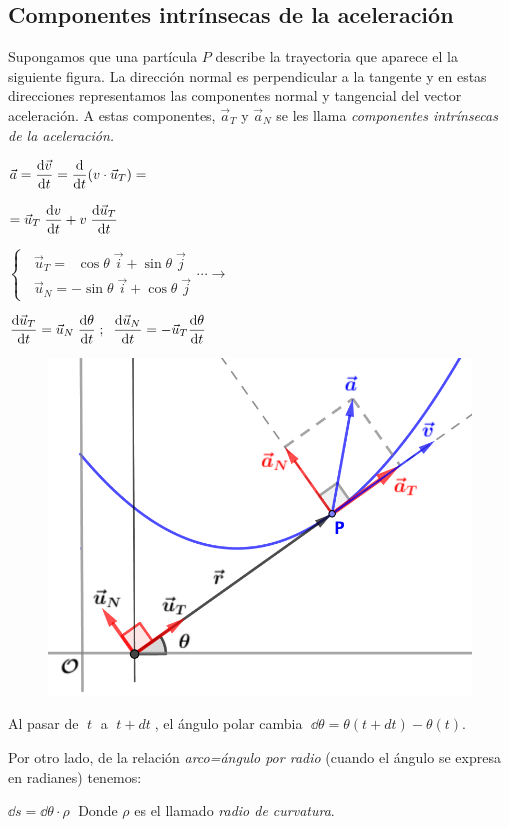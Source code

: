 \subsection{Componentes intrínsecas de la aceleración}

Supongamos que una partícula $P$ describe la trayectoria que aparece el la siguiente figura. La dirección normal es perpendicular a la tangente y en estas direcciones representamos las componentes normal y tangencial del vector aceleración. A estas componentes, $\vec a_T$ y $\vec a_N$ se les llama \emph{componentes intrínsecas de la aceleración.}

\begin{multicols}{2}
$\displaystyle \vec a=\dv{\vec v}{t}=\dv{t}(v\cdot \vec u_T)=$

$\displaystyle =\vec u_T\; \dv{v}{t}+v\;\dv{\vec u_T}{t}$

$\begin{cases} \;\;\vec u_T=\;\;\cos \theta\; \vec i + \sin \theta\; \vec j \\  \;\;\vec u_N = -\sin \theta \; \vec i + \cos \theta \;\vec j \end{cases} \cdots \to $

$\displaystyle \dv{\vec u_T}{t}=\vec u_N\; \dv{\theta}{t}\;;  \;\; 
\displaystyle \dv{\vec u_N}{t}=-\vec u_T \dv{\theta}{t}$

\begin{figure}[H]
		\centering
		\includegraphics[width=.45\textwidth]{imagenes/imagenes02/T02IM13.png}
		\end{figure}
\end{multicols}


Al pasar de $\;t\;$ a $\;t+dt\;$, el ángulo polar cambia $\;\dd \theta=\theta(t+dt)-\theta(t)$.

Por otro lado, de la relación \emph{arco=ángulo por radio} (cuando el ángulo se expresa en radianes) tenemos:

$\dd s=\dd \theta \cdot \rho\;$ Donde $\rho$ es el llamado \emph{radio de curvatura}.

